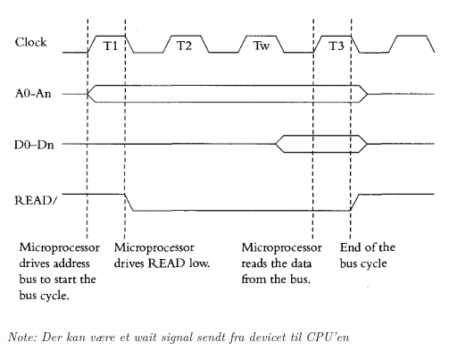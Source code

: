 \documentclass{paper}
\begin{document}
\includegraphics[scale=0.7]{busreadwaitstate.png}
	
\textit{Note: Der kan v\ae re et wait signal sendt fra devicet til CPU'en}
\end{document}
